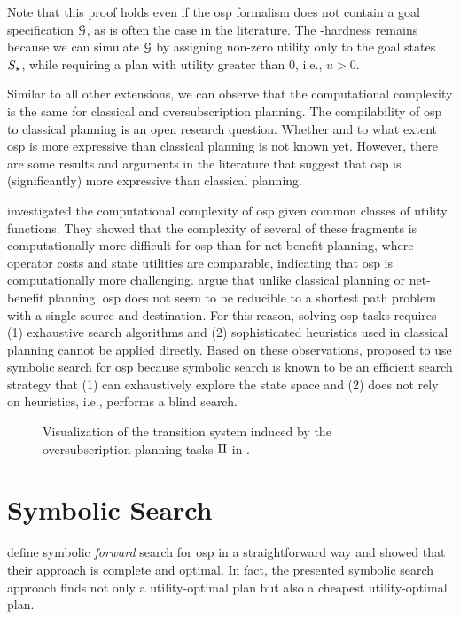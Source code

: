 Note that this proof holds even if the osp formalism does not contain a goal specification $\mathcal G$, as is often the case in the literature. The \PSPACE{}-hardness remains because we can simulate $\mathcal G$ by assigning non-zero utility only to the goal states $S_\star$, while requiring a plan with utility greater than $0$, i.e., $u>0$.

Similar to all other extensions, we can observe that the computational complexity is the same for classical and oversubscription planning.
The compilability of osp to classical planning is an open research question.
Whether and to what extent osp is more expressive than classical planning is not known yet.
However, there are some results and arguments in the literature that suggest that osp is (significantly) more expressive than classical planning.

\textcite{katz-mirkis-ijcai2016} investigated the computational complexity of osp given common classes of utility functions.
They showed that the complexity of several of these fragments is computationally more difficult for osp than for net-benefit planning, where operator costs and state utilities are comparable, indicating that osp is computationally more challenging.
\textcite{domshlak-mirkis-jair2015} argue that unlike classical planning or net-benefit planning, osp does not seem to be reducible to a shortest path problem with a single source and destination.
For this reason, solving osp tasks requires (1) exhaustive search algorithms and (2) sophisticated heuristics used in classical planning cannot be applied directly.
Based on these observations, \textcite{speck-katz-aaai2021} proposed to use symbolic search for osp because symbolic search is known to be an efficient search strategy that (1) can exhaustively explore the state space and (2) does not rely on heuristics, i.e., performs a blind search.

\begin{figure}
    \begin{center}
        \resizebox{1\textwidth}{!}{
            
        }
    \end{center}
    \caption[Visualization of an oversubscription planning task.]{Visualization of the transition system induced by the oversubscription planning tasks $\Pi$ in  \autocite{speck-katz-aaai2021}.}
    \label{fig:osp-example}
\end{figure}

\section{Symbolic Search}
\textcite{speck-katz-aaai2021} define symbolic \emph{forward} search for osp in a straightforward way and showed that their approach is complete and optimal.
In fact, the presented symbolic search approach finds not only a utility-optimal plan but also a cheapest utility-optimal plan.

